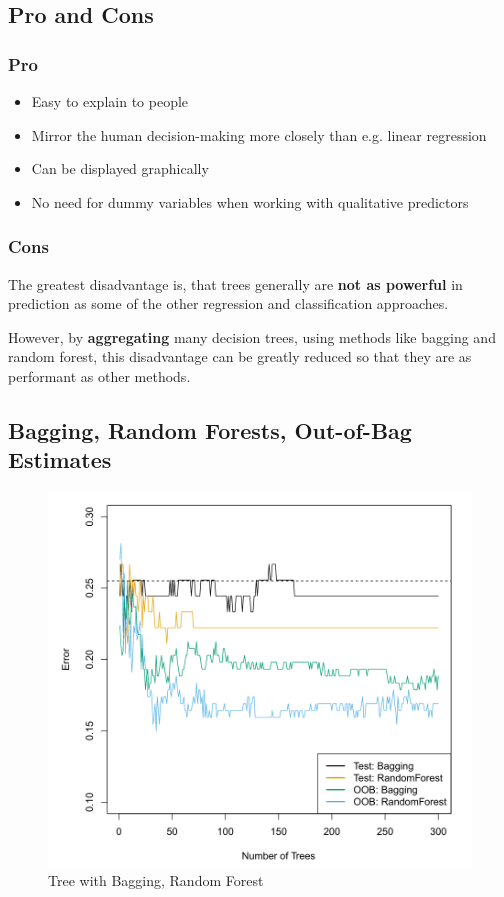 \documentclass[../Main.tex]{subfiles}
\begin{document}
\subsection{Pro and Cons}
\subsubsection{Pro}
\begin{itemize}
    \item Easy to explain to people
    \item Mirror the human decision-making more closely than e.g. linear regression
    \item Can be displayed graphically
    \item No need for dummy variables when working with qualitative predictors
\end{itemize}
\subsubsection{Cons}
The greatest disadvantage is, that trees generally are \textbf{not as powerful} in 
prediction as some of the other regression and classification approaches.

However, by \textbf{aggregating} many decision trees, using methods like 
bagging and random forest, this disadvantage can be greatly reduced 
so that they are as performant as other methods.

\subsection{Bagging, Random Forests, Out-of-Bag Estimates}

\begin{figure}[H]
    \centering
    \includegraphics[width=0.75\linewidth]{Images/tree-bagging-random-forest.png}
    \caption{Tree with Bagging, Random Forest}
\end{figure}
\end{document}
